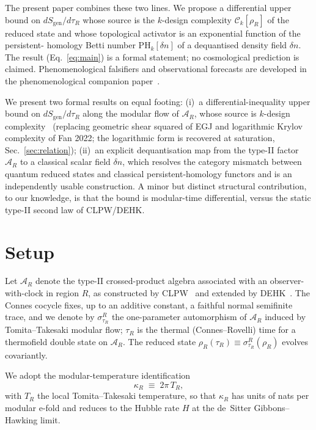 \documentclass[aps,prd,superscriptaddress,nofootinbib,floatfix,10pt]{revtex4-2}
\theoremstyle{remark}
\newcommand{\Sgen}{S_{\mathrm{gen}}}
\newcommand{\tauR}{\tau_{R}}
\newcommand{\kR}{\kappa_{R}}
\newcommand{\Ck}{\mathcal{C}_{k}}
\newcommand{\PHk}{\mathrm{PH}_{k}}
\newcommand{\dn}{\delta n}
\newcommand{\AR}{\mathcal{A}_{R}}
\begin{document}
The present paper combines these two lines. We propose a
differential upper bound on $d\Sgen/d\tauR$ whose source is the
$k$-design complexity $\Ck[\rho_{R}]$ of the reduced state and whose
topological activator is an exponential function of the persistent-
homology Betti number $\PHk[\dn]$ of a dequantised density field $\dn$.
The result (Eq.~\eqref{eq:main}) is a formal statement; no
cosmological prediction is claimed. Phenomenological falsifiers and
observational forecasts are developed in the phenomenological
companion paper~\cite{Remondiere2026ECIv5}.

We present two formal results on equal footing:
(i)~a differential-inequality upper bound on $d\Sgen/d\tauR$ along the
modular flow of $\AR$, whose source is $k$-design
complexity~\cite{MaHuang2025,Haferkamp2022} (replacing geometric shear
squared of EGJ and logarithmic Krylov complexity of Fan 2022; the
logarithmic form is recovered at saturation, Sec.~\ref{sec:relation});
(ii)~an explicit dequantisation map from the type-II factor $\AR$ to a
classical scalar field $\dn$, which resolves the category mismatch
between quantum reduced states and classical persistent-homology
functors and is an independently usable construction. A minor but
distinct structural contribution, to our knowledge, is that the bound
is modular-time differential, versus the static type-II second law
of CLPW/DEHK.

\section{Setup}
\label{sec:setup}

Let $\AR$ denote the type-II crossed-product algebra associated with an
observer-with-clock in region $R$, as constructed by
CLPW~\cite{CLPW2023} and extended by
DEHK~\cite{DEHK2025a,DEHK2025b}. The Connes cocycle fixes, up to an
additive constant, a faithful normal semifinite trace, and we denote by
$\sigma^{R}_{\tauR}$ the one-parameter automorphism of $\AR$ induced by
Tomita--Takesaki modular flow; $\tauR$ is the thermal (Connes--Rovelli)
time for a thermofield double state on $\AR$. The reduced state
$\rho_{R}(\tauR)\equiv\sigma^{R}_{\tauR}(\rho_{R})$ evolves
covariantly.

We adopt the modular-temperature identification
\begin{equation}
 \kR \;\equiv\; 2\pi\,T_{R},
 \label{eq:kappa}
\end{equation}
with $T_{R}$ the local Tomita--Takesaki temperature, so that $\kR$ has
units of nats per modular e-fold and reduces to the Hubble rate $H$ at
the de~Sitter Gibbons--Hawking limit.
\end{document}
